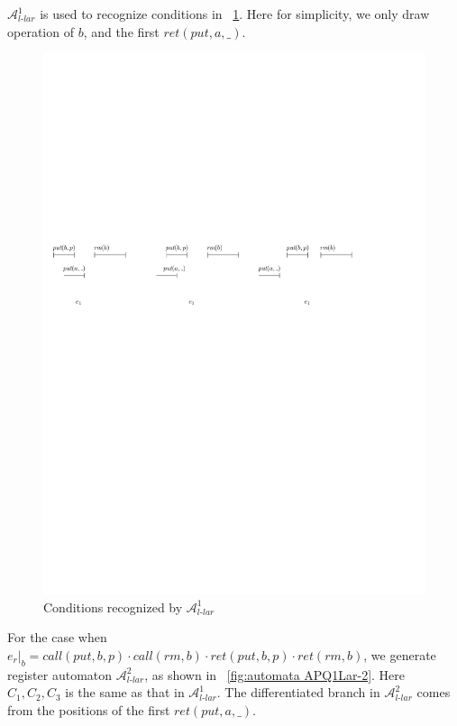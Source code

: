 $\mathcal{A}_{\textit{l-lar}}^1$ is used to recognize conditions in \figurename~\ref{fig:his for APQ1Lar-1}. Here for simplicity, we only draw operation of $b$, and the first $\textit{ret}(\textit{put},a,\_)$.


\begin{figure}[htbp]
  \centering
  \includegraphics[width=1 \textwidth]{figures/PIC_HIS_PQ1Lar-pprr.pdf}
  \caption{Conditions recognized by $\mathcal{A}_{\textit{l-lar}}^1$}
  \label{fig:his for APQ1Lar-1}
\end{figure}


For the case when $e_r \vert_{b} = \textit{call}(\textit{put},b,p) \cdot \textit{call}(\textit{rm},b) \cdot \textit{ret}(\textit{put},b,p) \cdot \textit{ret}(\textit{rm},b)$, we generate register automaton $\mathcal{A}_{\textit{l-lar}}^2$, as shown in \figurename~\ref{fig:automata APQ1Lar-2}. Here $C_1,C_2,C_3$ is the same as that in $\mathcal{A}_{\textit{l-lar}}^1$. The differentiated branch in $\mathcal{A}_{\textit{l-lar}}^2$ comes from the positions of the first $\textit{ret}(\textit{put},a,\_)$.

